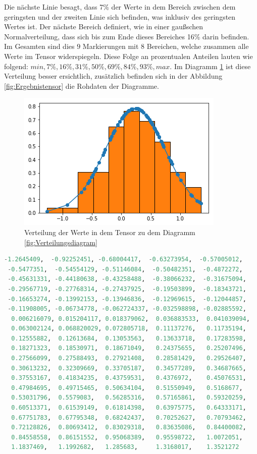 Die nächste Linie besagt, dass 7\% der Werte in dem Bereich zwischen dem geringsten und der zweiten Linie sich befinden, was inklusiv des geringsten Wertes ist.  
Der nächste Bereich definiert, wie in einer gaußschen Normalverteilung, dass sich bis zum Ende dieses Bereiches 16\% darin befinden. 
Im Gesamten sind dies $9$ Markierungen mit 8 Bereichen, welche zusammen alle Werte im Tensor widerspiegeln. 
Diese Folge an prozentualen Anteilen lauten wie folgend: $min, 7\%, 16\%, 31\%, 50\%, 69\%, 84\%, 93\%, max$. 
Im Diagramm \ref{fig:VerteilungsdiagrammPython} ist diese Verteilung besser ersichtlich, zusätzlich befinden sich in der Abbildung \ref{fig:Ergebnistensor} die Rohdaten der Diagramme. 
\begin{figure}
	\centering
	\includegraphics[scale=0.6]{images/gaussian.png}
	\caption{Verteilung der Werte in dem Tensor zu dem Diagramm \ref{fig:Verteilungsdiagram}}
	\label{fig:VerteilungsdiagrammPython}
\end{figure}
\begin{lstlisting}[caption={Sortierter Ergebnistensor zum Verteilungsdiagramm \ref{fig:VerteilungsdiagrammPython} und \ref{fig:Verteilungsdiagram} im Schritt $0$},label=fig:Ergebnistensor,captionpos=b,language=Python]
 -1.2645409,  -0.92252451, -0.68004417,  -0.63273954,  -0.57005012, 
 -0.5477351,  -0.54554129, -0.51146084,  -0.50482351,  -0.4872272, 
 -0.45631331, -0.44180638, -0.43258488,  -0.38066232,  -0.31675094, 
 -0.29567719, -0.27768314, -0.27437925,  -0.19503899,  -0.18343721, 
 -0.16653274, -0.13992153, -0.13946836,  -0.12969615,  -0.12044857, 
 -0.11908005, -0.06734778, -0.062724337, -0.032598898, -0.02885592, 
  0.006216079, 0.015204117, 0.018379062,  0.036883533,  0.041039094, 
  0.063002124, 0.068820029, 0.072805718,  0.11137276,   0.11735194, 
  0.12555882,  0.12613684,  0.13053563,   0.13633718,   0.17283598, 
  0.18271323,  0.18530971,  0.18671049,   0.24375655,   0.25207496, 
  0.27566099,  0.27588493,  0.27921408,   0.28581429,   0.29526407, 
  0.30613232,  0.32309669,  0.33705187,   0.34577289,   0.34687665, 
  0.37553167,  0.41834235,  0.43759531,   0.4376972,    0.45076531, 
  0.47984695,  0.49715465,  0.50634104,   0.51550949,   0.5168677, 
  0.53031796,  0.5579083,   0.56285316,   0.57165861,   0.59320259, 
  0.60513371,  0.61539149,  0.61814398,   0.63975775,   0.64333171, 
  0.67751783,  0.67795348,  0.68242437,   0.70252627,   0.70793462, 
  0.72128826,  0.80693412,  0.83029318,   0.83635086,   0.84400082, 
  0.84558558,  0.86151552,  0.95068389,   0.95598722,   1.0072051, 
  1.1837469,   1.1992682,   1.285683,     1.3168017,    1.3521272
\end{lstlisting}


